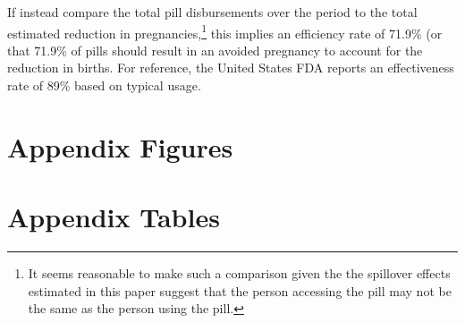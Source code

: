 If \person instead compare the total pill disbursements over the period to the 
total estimated reduction in pregnancies,\footnote{It seems reasonable to make 
such a comparison given the the spillover effects estimated in this paper suggest 
that the person accessing the pill may not be the same as the person using the 
pill.}  this implies an efficiency rate of 71.9\% (or that 71.9\% of pills should 
result in an avoided pregnancy to account for the reduction in births.  For 
reference, the United States FDA reports an effectiveness rate of 89\% based on
typical usage.

\newpage
\section{Appendix Figures}


\section{Appendix Tables}



%
